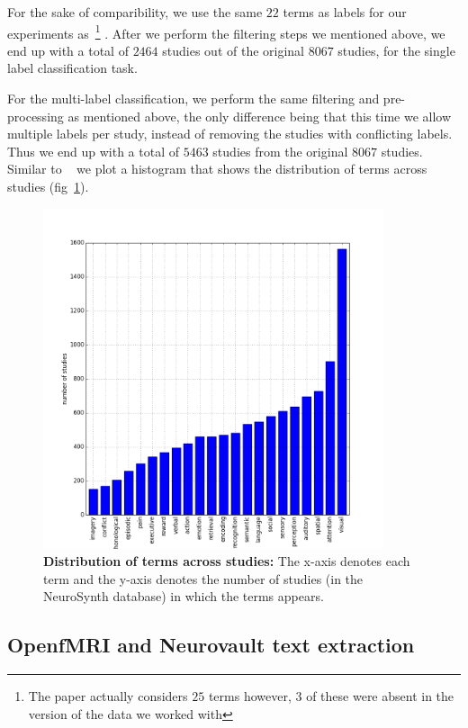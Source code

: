 \documentclass{article} %
\begin{document}
For the sake of comparibility, we use the same $22$ terms as labels for our experiments as~\cite{yarkoni2011large}\footnote{The paper actually considers $25$ terms however, $3$ of these were absent in the version of the data we worked with} . After we perform the filtering steps we mentioned above, we end up with a total of $2464$ studies out of the original $8067$ studies, for the single label classification task.

For the multi-label classification, we perform the same filtering and pre-processing as mentioned above, the only difference being that this time we allow multiple labels per study, instead of removing the studies with conflicting labels. Thus we end up with a total of $5463$ studies from the original $8067$ studies. Similar to ~\cite{sanmi2013multi} we plot a histogram that shows the distribution of terms across studies (fig~\ref{fig:histo_old}). 

\begin{figure}[h]
\begin{center}
\includegraphics[height=10cm, width=10cm]{histo_old.png}
\end{center}
\caption{\textbf{Distribution of terms across studies:} The x-axis denotes each term and the y-axis denotes the number of studies (in the NeuroSynth database) in which the terms appears.}
\label{fig:histo_old}
\end{figure}

\subsection{OpenfMRI and Neurovault text extraction}
\end{document}
